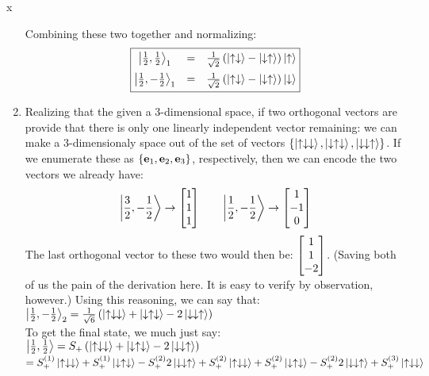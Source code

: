 x\documentclass[12pt]{article}
\begin{document}
\begin{enumerate}[label=\alph*)]
Combining these two together and normalizing:
\[\boxed{\mqty{ \ket{\frac{1}{2}, \frac{1}{2}}_1 & = & \frac{1}{\sqrt{2}} \left(\ket{\uparrow\downarrow}-\ket{\downarrow\uparrow}\right)\ket{\uparrow}\vspace{0.5em}\\ \ket{\frac{1}{2}, -\frac{1}{2}}_1 & = & \frac{1}{\sqrt{2}}\left(\ket{\uparrow\downarrow}-\ket{\downarrow\uparrow}\right)\ket{\downarrow}}}\]

\item Realizing that the given a 3-dimensional space, if two orthogonal vectors are provide that there is only one linearly independent vector remaining: we can make a 3-dimensionaly space out of the set of vectors $\{\ket{\uparrow\downarrow\downarrow}, \ket{\downarrow\uparrow\downarrow}, \ket{\downarrow\downarrow\uparrow}\}$. If we enumerate these as $\{\vb{e}_1, \vb{e}_2, \vb{e}_3\}$, respectively, then we can encode the two vectors we already have:
\[\ket{\frac{3}{2}, -\frac{1}{2}}\rightarrow \mqty[1\\1\\1] \qquad \ket{\frac{1}{2}, -\frac{1}{2}}\rightarrow \mqty[1\\-1\\0]\]
The last orthogonal vector to these two would then be: $\mqty[1\\1\\-2]$. (Saving both of us the pain of the derivation here. It is easy to verify by observation, however.) Using this reasoning, we can say that:\vspace{0.5em}\\
$\ket{\frac{1}{2}, -\frac{1}{2}}_2 = \frac{1}{\sqrt{6}}\left(\ket{\uparrow\downarrow\downarrow} + \ket{\downarrow\uparrow\downarrow} - 2\ket{\downarrow\downarrow\uparrow}\right)$\vspace{0.5em}\\
To get the final state, we much just say:\vspace{0.5em}\\
$\ket{\frac{1}{2}, \frac{1}{2}} = S_+\left(\ket{\uparrow\downarrow\downarrow}+ \ket{\downarrow\uparrow\downarrow} -2\ket{\downarrow\downarrow\uparrow}\right)$\vspace{0.5em}\\
\hspace*{2.7em}$ = S_+^{(1)}\ket{\uparrow\downarrow\downarrow} + S_+^{(1)}\ket{\downarrow\uparrow\downarrow} - S_+^{(2)}2\ket{\downarrow\downarrow\uparrow} + S_+^{(2)}\ket{\uparrow\downarrow\downarrow}+S_+^{(2)}\ket{\downarrow\uparrow\downarrow}-S_+^{(2)}2\ket{\downarrow\downarrow\uparrow} + S_+^{(3)}\ket{\uparrow\downarrow\downarrow}$\vspace{0.5em}\\

\end{enumerate}
\end{document}
